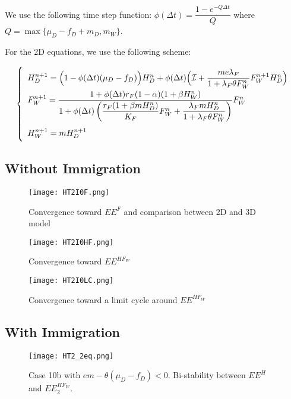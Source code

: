 \documentclass{article}
\newcommand{\lfw}{\lambda_{F}}
\newcommand{\lfw}{\lambda_{F}}
\newcommand{\cI}{\mathcal{I}}
\begin{document}
We use the following time step function: $\phi(\Delta t) = \dfrac{1 - e^{-Q \Delta t}}{Q}$ where $Q = \max\{\mu_D - f_D + m_D, m_W\}$.

For the 2D equations, we use the following scheme:

\begin{equation}
\def\arraystretch{2}
\left\lbrace \begin{array}{l}
H_D^{n+1} = \Big(1 - \phi(\Delta t)(\mu_D - f_D)\Big)H_D^n + \phi(\Delta t) \Big(\cI  +\dfrac{m e \lfw}{1 + \lfw \theta F_W^n} F_W^{n+1} H_D^n \Big) \\
F_W^{n+1} = \dfrac{1 + \phi(\Delta t) r_F(1-\alpha) (1 + \beta H_W^n)}{1 + \phi(\Delta t) \left(\dfrac{r_F(1 + \beta m H_D^n)}{K_F}F_W^n + \dfrac{ \lfw m H_D^n}{1 + \lfw \theta F_W^n}\right)}F_W^n \\
H_W^{n+1} = m H_D^{n+1}
\end{array} \right.
\end{equation}




\subsection{Without Immigration}

\begin{figure}[!ht]
\centering
\texttt{[image: HT2I0F.png]}
\caption{Convergence toward $EE^{F}$ and comparison between 2D and 3D model}
\end{figure}

\begin{figure}[!ht]
\centering
\texttt{[image: HT2I0HF.png]}
\caption{Convergence toward $EE^{HF_W}$}
\end{figure}

\begin{figure}[!ht]
\centering
\texttt{[image: HT2I0LC.png]}
\caption{Convergence toward a limit cycle around $EE^{HF_W}$}
\end{figure}

\newpage

\subsection{With Immigration}

\begin{figure}[!ht]
\centering
\texttt{[image: HT2\_2eq.png]}
\caption{Case 10b with $em - \theta(\mu_D - f_D) < 0$. Bi-stability between $EE^H$ and $EE^{HF_W}_2$.}
\end{figure}
\end{document}
